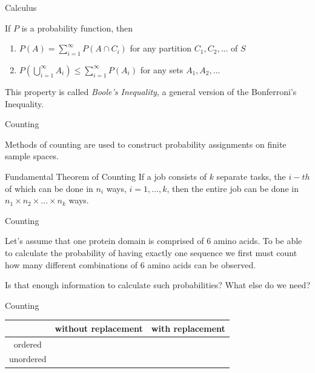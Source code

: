 \documentclass{beamer}
\begin{document}
\begin{frame}{Calculus}

	If $P$ is a probability function, then
	\begin{enumerate}
		\item $P(A) = \sum_{i=1}^\infty P(A \cap C_i)$ for any partition $C_1, C_2, ...$ of $S$
		\item $P(\bigcup_{i=1}^\infty A_i) \leq \sum_{i=1}^\infty P(A_i) $ for any sets $A_1, A_2, ...$ 
	\end{enumerate}

	This property is called \textit{Boole's Inequality}, a general version of the Bonferroni's Inequality.

\end{frame}

\begin{frame}{Counting}

	Methods of counting are used to construct probability assignments on finite sample spaces.

	\begin{block}{Fundamental Theorem of Counting}
		If a job consists of $k$ separate tasks, the $i-th$ of which can be done in $n_i$ ways, $i=1,...,k$, 
		then the entire job can be done in $n_1 \times n_2 \times ... \times n_k$ ways.
	\end{block}

\end{frame}

\begin{frame}{Counting}

	Let's assume that one protein domain is comprised of 6 amino acids. To be able to calculate the 
	probability of having exactly one sequence we first must count how many different combinations 
	of 6 amino acids can be observed.

	\vskip 1cm

	Is that enough information to calculate such probabilities? What else do we need?

\end{frame}

\begin{frame}{Counting}

	\begin{table}[]
		\begin{tabular}{c|c|c}
			& without replacement & with replacement \\
		\hline
			ordered &  & \\
		\hline
			unordered &  &\\
		\hline
		\end{tabular}
	\end{table}

\end{frame}
\end{document}
